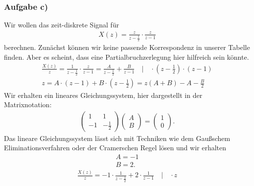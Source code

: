 \subsubsection{Aufgabe c)}
Wir wollen das zeit-diskrete Signal für
\begin{align}
	X(z)=\frac{z}{z-\frac{1}{2}}\cdot\frac{z}{z-1}
\end{align}
berechnen.
Zunächst können wir keine passende Korrespondenz in unserer Tabelle finden. Aber es scheint, dass eine Partialbruchzerlegung hier hilfreich sein könnte.
\begin{align}
	\frac{X(z)}{z}=\frac{1}{z-\frac{1}{2}}\cdot\frac{z}{z-1}=\frac{A}{z-\frac{1}{2}}+\frac{B}{z-1} \quad \Bigg | \quad\cdot (z-\frac{1}{2})\cdot(z-1)\nonumber\\
	z=A\cdot(z-1)+B\cdot(z-\frac{1}{2})=z(A+B)-A-\frac{B}{2}
\end{align}
Wir erhalten ein lineares Gleichungssystem, hier dargestellt in der Matrixnotation:
\begin{align}
	\begin{pmatrix}
		1 & 1\\
		-1 & -\frac{1}{2}
	\end{pmatrix}
	\begin{pmatrix}
		A \\
		B
	\end{pmatrix}
	=
	\begin{pmatrix}
		1 \\
		0
	\end{pmatrix}.
\end{align}
Das lineare Gleichungssystem lässt sich mit Techniken wie dem Gaußschem Eliminationsverfahren oder der Cramerschen Regel lösen und wir erhalten
\begin{align}
	A = -1 \nonumber \\
	B = 2.
\end{align}
\begin{align}
	\frac{X(z)}{z}=-1\cdot\frac{1}{z-\frac{1}{2}}+2\cdot\frac{1}{z-1} \quad\Bigg | \quad \cdot z
\end{align}

